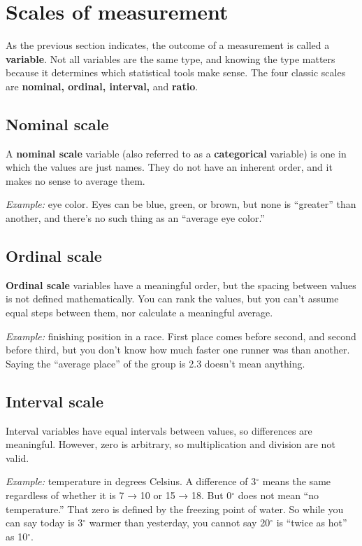 \documentclass[
  letterpaper,
  DIV=11,
  numbers=noendperiod]{scrreprt}
\begin{document}
\section{Scales of measurement}\label{scales-of-measurement}

As the previous section indicates, the outcome of a measurement is
called a \textbf{variable}. Not all variables are the same type, and
knowing the type matters because it determines which statistical tools
make sense. The four classic scales are \textbf{nominal, ordinal,
interval,} and \textbf{ratio}.

\subsection{Nominal scale}\label{nominal-scale}

A \textbf{nominal scale} variable (also referred to as a
\textbf{categorical} variable) is one in which the values are just
names. They do not have an inherent order, and it makes no sense to
average them.

\emph{Example:} eye color. Eyes can be blue, green, or brown, but none
is ``greater'' than another, and there's no such thing as an ``average
eye color.''

\subsection{Ordinal scale}\label{ordinal-scale}

\textbf{Ordinal scale} variables have a meaningful order, but the
spacing between values is not defined mathematically. You can rank the
values, but you can't assume equal steps between them, nor calculate a
meaningful average.

\emph{Example:} finishing position in a race. First place comes before
second, and second before third, but you don't know how much faster one
runner was than another. Saying the ``average place'' of the group is
2.3 doesn't mean anything.

\subsection{Interval scale}\label{interval-scale}

Interval variables have equal intervals between values, so differences
are meaningful. However, zero is arbitrary, so multiplication and
division are not valid.

\emph{Example:} temperature in degrees Celsius. A difference of
3\(^\circ\) means the same regardless of whether it is 7 → 10 or 15 →
18. But 0\(^\circ\) does not mean ``no temperature.'' That zero is
defined by the freezing point of water. So while you can say today is
3\(^\circ\) warmer than yesterday, you cannot say 20\(^\circ\) is
``twice as hot'' as 10\(^\circ\).
\end{document}
